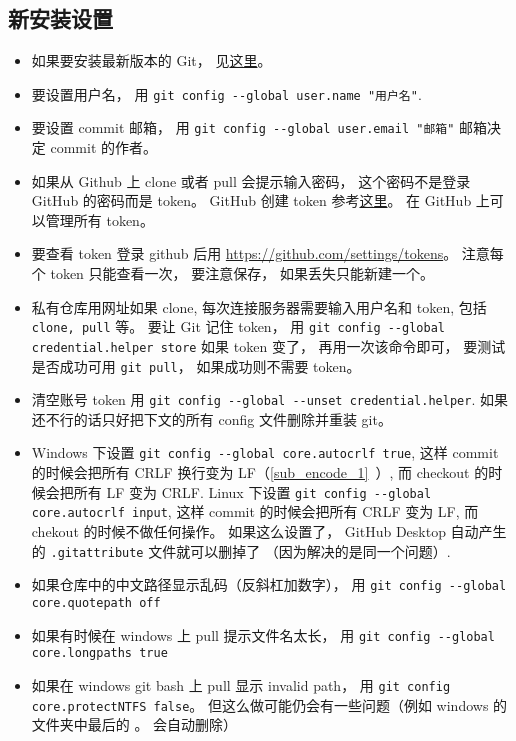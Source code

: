 \subsection{新安装设置}
\begin{itemize}
\item 如果要安装最新版本的 Git， 见\href{https://git-scm.com/downloads}{这里}。
\item 要设置用户名， 用 \verb|git config --global user.name "用户名"|.
\item 要设置 commit 邮箱， 用 \verb|git config --global user.email "邮箱"|  邮箱决定 commit 的作者。
\item 如果从 Github 上 clone 或者 pull 会提示输入密码， 这个密码不是登录 GitHub 的密码而是 token。 GitHub 创建 token 参考\href{https://docs.github.com/en/github/authenticating-to-github/keeping-your-account-and-data-secure/creating-a-personal-access-token#creating-a-token}{这里}。 在 GitHub 上可以管理所有 token。
\item 要查看 token 登录 github 后用 \href{https://github.com/settings/tokens/}{https://github.com/settings/tokens}。 注意每个 token 只能查看一次， 要注意保存， 如果丢失只能新建一个。
\item 私有仓库用网址如果 clone, 每次连接服务器需要输入用户名和 token, 包括 \verb|clone, pull| 等。 要让 Git 记住 token， 用 \verb|git config --global credential.helper store| 如果 token 变了， 再用一次该命令即可， 要测试是否成功可用 \verb|git pull|， 如果成功则不需要 token。
\item 清空账号 token 用 \verb|git config --global --unset credential.helper|. 如果还不行的话只好把下文的所有 config 文件删除并重装 git。
\item Windows 下设置 \verb|git config --global core.autocrlf true|, 这样 commit 的时候会把所有 CRLF 换行变为 LF（\autoref{sub_encode_1}~）, 而 checkout 的时候会把所有 LF 变为 CRLF. Linux 下设置 \verb|git config --global core.autocrlf input|, 这样 commit 的时候会把所有 CRLF 变为 LF, 而 chekout 的时候不做任何操作。 如果这么设置了， GitHub Desktop 自动产生的 \verb|.gitattribute| 文件就可以删掉了 （因为解决的是同一个问题）.
\item 如果仓库中的中文路径显示乱码（反斜杠加数字）， 用 \verb|git config --global core.quotepath off|
\item 如果有时候在 windows 上 pull 提示文件名太长， 用 \verb|git config --global core.longpaths true|
\item 如果在 windows git bash 上 pull 显示 invalid path， 用 \verb|git config core.protectNTFS false|。 但这么做可能仍会有一些问题（例如 windows 的文件夹中最后的 。 会自动删除）

\end{itemize}
